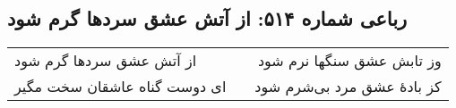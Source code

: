 \begin{center}
\section*{رباعی شماره ۵۱۴: از آتش عشق سردها گرم شود}
\label{sec:0514}
\begin{longtable}{l p{0.5cm} r}
از آتش عشق سردها گرم شود
&&
وز تابش عشق سنگها نرم شود
\\
ای دوست گناه عاشقان سخت مگیر
&&
کز بادهٔ عشق مرد بی‌شرم شود
\\
\end{longtable}
\end{center}
